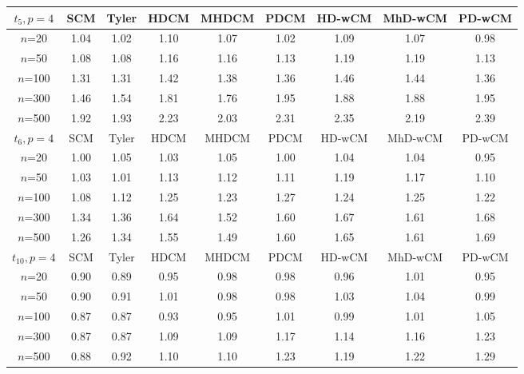 %
\begin{table}[ht]
\begin{footnotesize}
    \begin{tabular}{c|cc|ccc|ccc}
    \hline
    $t_5, p=4$    & SCM  & Tyler & HDCM & MHDCM & PDCM & HD-wCM & MhD-wCM & PD-wCM \\ \hline
    $n$=20             & 1.04 & 1.02  & 1.10   & 1.07   & 1.02  & 1.09    & 1.07    & 0.98   \\
    $n$=50             & 1.08 & 1.08  & 1.16   & 1.16   & 1.13  & 1.19    & 1.19    & 1.13   \\
    $n$=100            & 1.31 & 1.31  & 1.42   & 1.38   & 1.36  & 1.46    & 1.44    & 1.36   \\
    $n$=300            & 1.46 & 1.54  & 1.81   & 1.76   & 1.95  & 1.88    & 1.88    & 1.95   \\
    $n$=500            & 1.92 & 1.93  & 2.23   & 2.03   & 2.31  & 2.35    & 2.19    & 2.39   \\ \hline
    $t_6, p=4$    & SCM  & Tyler & HDCM & MHDCM & PDCM & HD-wCM & MhD-wCM & PD-wCM \\ \hline
    $n$=20             & 1.00 & 1.05  & 1.03   & 1.05   & 1.00  & 1.04    & 1.04    & 0.95   \\
    $n$=50             & 1.03 & 1.01  & 1.13   & 1.12   & 1.11  & 1.19    & 1.17    & 1.10   \\
    $n$=100            & 1.08 & 1.12  & 1.25   & 1.23   & 1.27  & 1.24    & 1.25    & 1.22   \\
    $n$=300            & 1.34 & 1.36  & 1.64   & 1.52   & 1.60  & 1.67    & 1.61    & 1.68   \\
    $n$=500            & 1.26 & 1.34  & 1.55   & 1.49   & 1.60  & 1.65    & 1.61    & 1.69   \\ \hline
    $t_{10}, p=4$ & SCM  & Tyler & HDCM & MHDCM & PDCM & HD-wCM & MhD-wCM & PD-wCM \\ \hline
    $n$=20             & 0.90 & 0.89  & 0.95   & 0.98   & 0.98  & 0.96    & 1.01    & 0.95   \\
    $n$=50             & 0.90 & 0.91  & 1.01   & 0.98   & 0.98  & 1.03    & 1.04    & 0.99   \\
    $n$=100            & 0.87 & 0.87  & 0.93   & 0.95   & 1.01  & 0.99    & 1.01    & 1.05   \\
    $n$=300            & 0.87 & 0.87  & 1.09   & 1.09   & 1.17  & 1.14    & 1.16    & 1.23   \\
    $n$=500            & 0.88 & 0.92  & 1.10   & 1.10   & 1.23  & 1.19    & 1.22    & 1.29   \\ \hline

\end{tabular}
\end{footnotesize}
\end{table}
